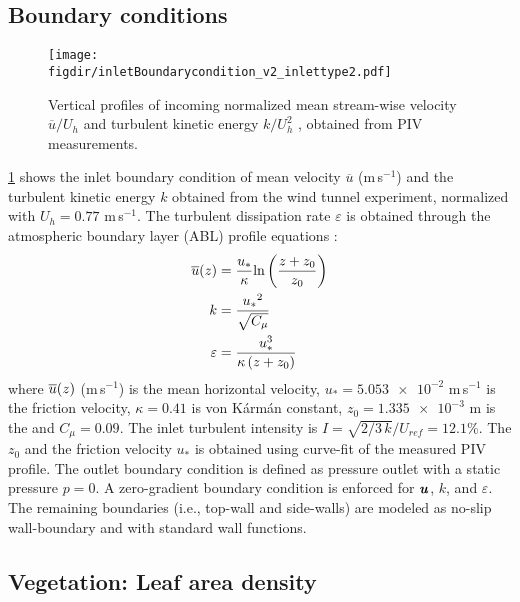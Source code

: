 \subsection{Boundary conditions}

\begin{figure}[t]
	\centering
	\texttt{[image: \\figdir/inletBoundarycondition\_v2\_inlettype2.pdf]}
	\caption{Vertical profiles of incoming normalized  mean stream-wise velocity $\overline{u}/U_h$ and   turbulent kinetic energy $k/U_h^2$ , obtained from PIV measurements.}
	\label{fig:boundaryprofile}
\end{figure}

\cref{fig:boundaryprofile} shows the inlet boundary condition of mean velocity $\overline{u}$ (m\,s$^{-1}$) and the turbulent kinetic energy $k$ obtained from the wind tunnel experiment, normalized with $U_h = 0.77$ m\,s$^{-1}$. The turbulent dissipation rate $\varepsilon$ is obtained through the atmospheric boundary layer (ABL) profile equations \citep{Richards1993}:
\begin{align}
	\overline{u}(z) &= \frac{{{u_*}}}{\kappa }{\text{ln}}\left( {\frac{{z + {z_0}}}{{{z_0}}}} \right) \\
	k &= \frac{{{u_*}^2}}{{\sqrt {{C_\mu }} }} \\
	\varepsilon  &= \frac{{u_*^3}}{{\kappa \left( {z + {z_0}} \right)}}
	\label{eq:ableq}
\end{align}
where $\overline{u}(z)$ (m\,s$^{-1}$) is the mean horizontal velocity, $u_*= \num{5.053e-2}$ m\,s$^{-1}$ is  the friction velocity, $\kappa=0.41$ is von K\'arm\'an constant, $z_0 = \num{1.335e-3}$ m is the  and $C_{\mu}=0.09$. The inlet turbulent intensity is $\textit{I} = \sqrt{2/3\,k}/U_{ref} = 12.1 \%$. The  $z_0$ and the friction velocity $u_*$ is obtained using curve-fit of the measured PIV profile. The outlet boundary condition is defined as pressure outlet with a static pressure $p=0$. A zero-gradient boundary condition is enforced for $\textbf{\textit{u}}$, $k$, and $\varepsilon$. The remaining boundaries (i.e., top-wall and side-walls) are modeled as no-slip wall-boundary and with standard wall functions.

\subsection{Vegetation: Leaf area density}

